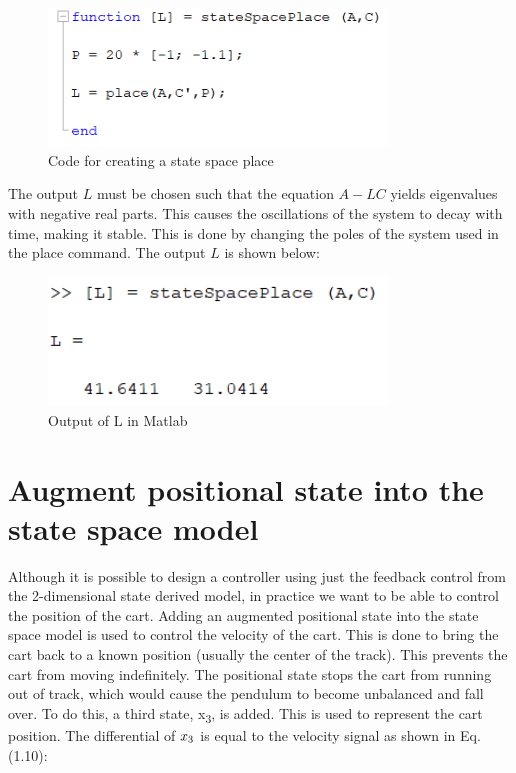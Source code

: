 \documentclass[11pt]{report}
\begin{document}
\begin{figure}[H]
\centerline{\includegraphics[width=9cm]{stateSpacePlace.png}}
\caption{Code for creating a state space place}
\label{fig}
\end{figure}

The output $L$ must be chosen such that the equation $A-LC$ yields eigenvalues with negative real parts. This causes the oscillations of the system to decay with time, making it stable. This is done by changing the poles of the system used in the place command.  The output $L$ is shown below:

\begin{figure}[H]
\centerline{\includegraphics[width=9cm]{stateSpacePlaceoutput.png}}
\caption{Output of L in Matlab}
\label{fig}
\end{figure}

\section{Augment positional state into the state space model}

Although it is possible to design a controller using just the feedback control from the 2-dimensional state derived model, in practice we want to be able to control the position of the cart. Adding an augmented positional state into the state space model is used to control the velocity of the cart. This is done to bring the cart back to a known position (usually the center of the track). This prevents the cart from moving indefinitely. The positional state stops the cart from running out of track, which would cause the pendulum to become unbalanced and fall over. To do this, a third state, x\textsubscript{3}, is added. This is used to represent the cart position. The differential of $x\textsubscript{3}$ is equal to the velocity signal as shown in Eq.(1.10):
\end{document}
